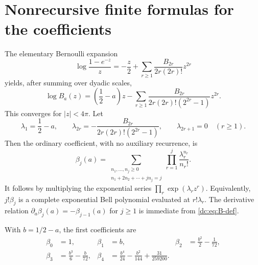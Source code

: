\documentclass[11pt,a4paper,oneside,openany]{book}
\numberwithin{equation}{chapter}
\theoremstyle{definition}
\theoremstyle{remark}
\newcommand{\abs}[1]{\left\lvert #1\right\rvert}
\begin{document}
\section{Nonrecursive finite formulas for the coefficients}
The elementary Bernoulli expansion
\[
 \log\frac{1-e^{-z}}z
 =-\frac z2+\sum_{r\ge1}\frac{B_{2r}}{2r(2r)!}z^{2r}
\]
yields, after summing over dyadic scales,
\begin{equation}
 \log B_a(z)=\left(\frac12-a\right)z
 -\sum_{r\ge1}
 \frac{B_{2r}}{2r(2r)!(2^{2r}-1)}z^{2r}.
 \label{dc:eq:log-B}
\end{equation}
This converges for $\abs z<4\pi$. Let
\begin{equation}
 \lambda_1=\frac12-a,\qquad
 \lambda_{2r}=-\frac{B_{2r}}{2r(2r)!(2^{2r}-1)},\qquad
 \lambda_{2r+1}=0\quad(r\ge1).
 \label{dc:eq:lambdas}
\end{equation}
Then the ordinary coefficient, with no auxiliary recurrence, is
\begin{equation}
 \boxed{\displaystyle
 \beta_j(a)=
 \sum_{\substack{n_1,\ldots,n_j\ge0\\
                  n_1+2n_2+\cdots+jn_j=j}}
 \prod_{r=1}^j\frac{\lambda_r^{n_r}}{n_r!}.}
 \label{dc:eq:beta-finite}
\end{equation}
It follows by multiplying the exponential series
$\prod_r\exp(\lambda_rz^r)$. Equivalently, $j!\beta_j$ is a complete
exponential Bell polynomial evaluated at $r!\lambda_r$.
The derivative relation
$\partial_a\beta_j(a)=-\beta_{j-1}(a)$ for $j\ge1$ is immediate
from \cref{dc:eq:B-def}.

With $b=1/2-a$, the first coefficients are
\begin{align}
 \beta_0&=1,& \beta_1&=b,&
 \beta_2&=\frac{b^2}{2}-\frac1{72},\nonumber\\
 \beta_3&=\frac{b^3}{6}-\frac b{72},&
 \beta_4&=\frac{b^4}{24}-\frac{b^2}{144}
              +\frac{31}{259200}.
 \label{dc:eq:beta-first}
\end{align}
\end{document}

